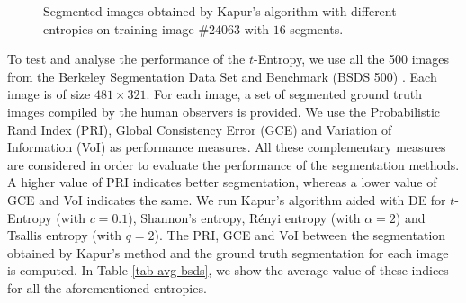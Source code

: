\documentclass{article}
\begin{document}
\begin{figure}[ht]
\centering
{}
\hfil
{}
\hfil
{}
\label{fig_second_case3}
\hfil
{}
\hfil
{}
\hfil
{}
\caption{Segmented images obtained by Kapur's algorithm with different entropies on training image $\#24063$ with $16$ segments.}
\label{fig_sim1}
\end{figure}

To test and analyse the performance of the $t$-Entropy, we use all the 500 images from the Berkeley Segmentation Data Set and Benchmark (BSDS 500) \cite{MartinFTM01}. Each image is of size $481 \times 321$. For each image, a set
of segmented ground truth images compiled by the human observers is provided. We use the Probabilistic Rand Index (PRI), Global Consistency Error (GCE) and Variation of Information (VoI) \cite{unnikrishnan2007toward,freixenet2002yet,pantofaru2005comparison} as performance measures. All these complementary measures are considered in order to evaluate the performance of the segmentation methods. A higher value of PRI indicates better segmentation, whereas a lower value of GCE and VoI indicates the same. We run Kapur's algorithm aided with DE for $t$-Entropy (with $c=0.1$), Shannon's entropy, R\'enyi entropy (with $\alpha=2$) and Tsallis entropy (with $q=2$). The PRI, GCE and VoI between the segmentation obtained by Kapur's method and the ground truth segmentation for each image is computed. In Table \ref{tab avg bsds}, we show the average value of these indices for all the aforementioned entropies.%
\end{document}
